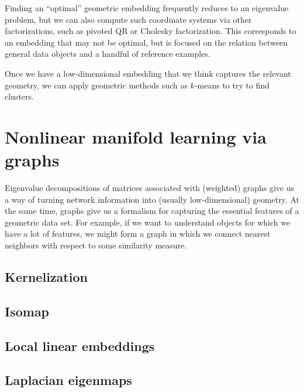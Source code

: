 \documentclass[12pt, leqno]{article} %
\begin{document}
Finding an ``optimal'' geometric embedding frequently reduces to an
eigenvalue problem, but we can also compute such coordinate systems
via other factorizations, such as pivoted QR or Cholesky
factorization.  This corresponds to an embedding that may not be
optimal, but is focused on the relation between general data objects
and a handful of reference examples.

Once we have a low-dimensional embedding that we think captures the
relevant geometry, we can apply geometric methods such as $k$-means
to try to find clusters.

\section{Nonlinear manifold learning via graphs}

Eigenvalue decompositions of matrices associated with (weighted)
graphs give us a way of turning network information into (usually
low-dimensional) geometry.  At the same time, graphs give us a
formalism for capturing the essential features of a geometric data
set.  For example, if we want to understand objects for which we have
a lot of features, we might form a graph in which we connect nearest
neighbors with respect to some similarity measure.

\subsection{Kernelization}

\subsection{Isomap}

\subsection{Local linear embeddings}

\subsection{Laplacian eigenmaps}

\end{document}

